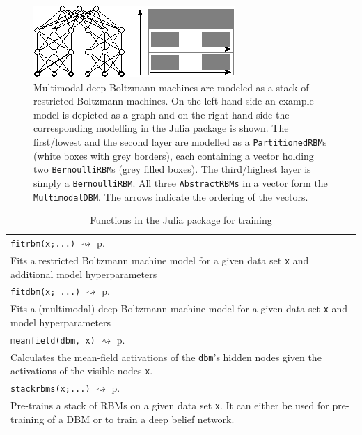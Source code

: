 \documentclass[12pt]{article}
\newcommand{\inlinecode}[1]{\texttt{#1}}
\newcommand{\rightpageref}[1]{\hfill $\rightsquigarrow$ p. \pageref{#1}}
\begin{document}
\begin{figure}[h]
   \centering
   \includegraphics[scale=3.]{images/MDBMImpl.eps}
   \caption{Multimodal deep Boltzmann machines are modeled as a stack of restricted Boltzmann machines. On the left hand side an example model is depicted as a graph and on the right hand side the corresponding modelling in the Julia package is shown.
   The first/lowest and the second layer are modelled as a \inlinecode{PartitionedRBM}s (white boxes with grey borders), each containing a vector holding two \inlinecode{BernoulliRBM}s (grey filled boxes).
   The third/highest layer is simply a \inlinecode{BernoulliRBM}.
   All three \inlinecode{AbstractRBMs} in a vector form the \inlinecode{MultimodalDBM}.
   The arrows indicate the ordering of the vectors.}
\label{mdbmimplasstack}
\end{figure}


\begin{table}
\begin{tabularx}{\textwidth}{X}
   \hline
   \inlinecode{fitrbm(x;...)} \rightpageref{bms_fitrbm} \\
   Fits a restricted Boltzmann machine model for a given data set \inlinecode{x} and additional model hyperparameters \\
   \inlinecode{fitdbm(x; ...)} \rightpageref{bms_fitdbm} \\
   Fits a (multimodal) deep Boltzmann machine model for a given data set \inlinecode{x} and model hyperparameters \\
   \inlinecode{meanfield(dbm, x)} \rightpageref{bms_meanfield}\\
   Calculates the mean-field activations of the \inlinecode{dbm}'s hidden nodes given the activations of the visible nodes \inlinecode{x}. \\
   \inlinecode{stackrbms(x;...)} \rightpageref{bms_stackrbms}\\
   Pre-trains a stack of RBMs on a given data set \inlinecode{x}. It can either be used for pre-training of a DBM or to train a deep belief network. \\
   \hline
\end{tabularx}
\caption{Functions in the Julia package for training}\label{juliaFunTableTrain}
\end{table}
\end{document}
